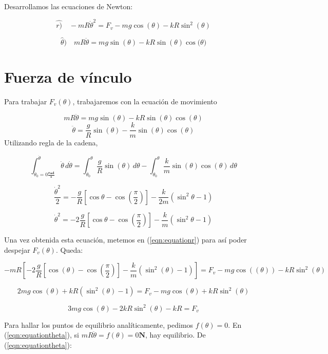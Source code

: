 \documentclass{article}
\begin{document}
	Desarrollamos las ecuaciones de Newton:
	
	\begin{equation}
	\label{eqn:equationr}
		\hat{r)} \quad -mR\dot{\theta}^2 = F_v - mg \cos{(\theta)} - kR \sin^2{(\theta)}
	\end{equation}
    
    \begin{equation}
    \label{eqn:equationtheta}
    	\hat{\theta}) \quad mR\ddot{\theta} = mg \sin{(\theta)} - kR \sin{(\theta)} \cos{(\theta})
    \end{equation}
    
    \section{Fuerza de v\'inculo}
    
    Para trabajar $F_v(\theta)$, trabajaremos con la ecuaci\'on de movimiento
    
    $$mR\ddot{\theta} = mg \sin{(\theta)} - kR \sin{(\theta)} \cos{(\theta)}$$
    $$\ddot{\theta} = \frac{g}{R} \sin{(\theta)} - \frac{k}{m} \sin{(\theta)} \cos{(\theta)}$$
   	Utilizando regla de la cadena,
   	
   	 $$ \int_{\dot{\theta}_0 = 0 \frac{\textbf{rad}}{\textbf{s}}}^{\dot{\theta}} \! \dot{\theta} \, d\dot{\theta} =
   	 	\int_{\theta_0}^{\theta} \! \frac{g}{R} \sin{(\theta)} \, d\theta -
   	 	\int_{\theta_0}^{\theta} \! \frac{k}{m} \sin{(\theta)} \cos{(\theta)} \, d\theta$$
   	 	
   	 $$ \frac{\dot{\theta}^2}{2} =
   	 	-\frac{g}{R} [ \cos{\theta} - \cos{(\frac{\pi}{2})} ] - \frac{k}{2m}(\sin^2{\theta} - 1) $$
   	 	
   	 $$ \dot{\theta}^2 =
   	 	-2\frac{g}{R} [ \cos{\theta} - \cos{(\frac{\pi}{2})} ] - \frac{k}{m}(\sin^2{\theta} - 1) $$
   	 	
   	 Una vez obtenida esta ecuaci\'on, metemos en (\ref{eqn:equationr}) para as\'i poder despejar $F_v(\theta)$. Queda:
   	 
   	 $$
   	 -mR[-2\frac{g}{R} [ \cos{(\theta)} - \cos{(\frac{\pi}{2})} ] - \frac{k}{m}(\sin^2{(\theta)} - 1)] = F_v - mg \cos{((\theta))} - kR \sin^2{(\theta)}
   	 $$
   	 
   	 $$
   	 	2mg \cos{(\theta)} + kR(\sin^2{(\theta)} - 1) = F_v - mg\cos{(\theta)} + kR\sin^2{(\theta)}
   	 $$
   	 
   	 $$
   		3mg \cos{(\theta)} - 2kR\sin^2{(\theta)} - kR = F_v
   	 $$
   	 
   	 Para hallar los puntos de equilibrio anal\'iticamente, pedimos $f(\theta) = 0$. En (\ref{eqn:equationtheta}), si $mR \ddot{\theta} = f(\theta) = 0 \textbf{N}$, hay equilibrio. De (\ref{eqn:equationtheta}):
   	 
\end{document}
